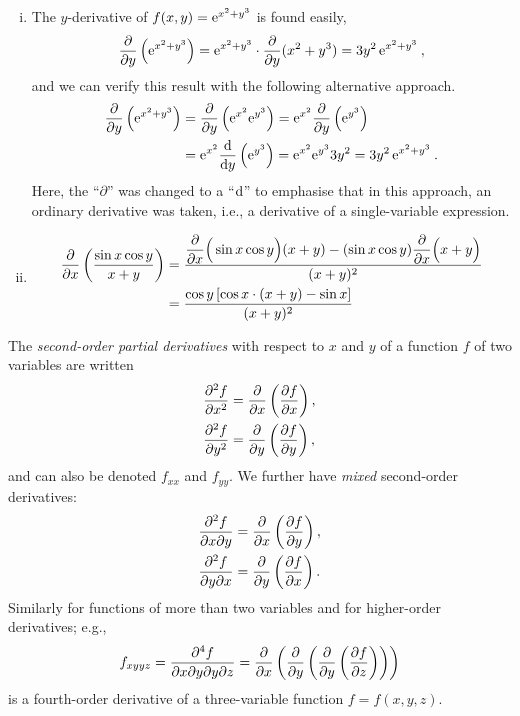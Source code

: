 \begin{example}
\begin{enumerate}[(i)]
	\item The $y$-derivative of $f(x,y)=\e^{x^2+y^3}$ is found easily,
	\[ \df{}{y} \left( \e^{x^2+y^3} \right) 
	= \e^{x^2+y^3} \cdot \df{}{y}(x^2+y^3) = 3y^2 \, \e^{x^2+y^3} \:, \]
	and we can verify this result with the following alternative approach.
	\begin{equation*}
	\begin{split}
	\df{}{y} \left( \e^{x^2+y^3} \right) & = \df{}{y} \left( \e^{x^2}\e^{y^3} \right) = \e^{x^2} \df{}{y} \left( \e^{y^3} \right) \\
	& = \e^{x^2} \Df{}{y} \left( \e^{y^3} \right) = \e^{x^2} \e^{y^3} 3y^2 
	= 3y^2 \, \e^{x^2+y^3} \:. 
	\end{split}
	\end{equation*}
	Here, the ``$\partial$'' was changed to a ``$\d$'' to emphasise that in this approach, an ordinary derivative was taken, i.e., a derivative of a single-variable expression.
	\item 
	\[\begin{split}
	 \df{}{x}\left( \frac{\sin x \cos y }{x+y}\right) 
	& = \frac{\df{}{x}\Big(\sin x \cos y\Big) (x+y) - (\sin x \cos y)\df{}{x}\Big(x+y\Big)}{(x+y)^2} \\
	& = \frac{\cos y \left[ \cos x \cdot (x+y) - \sin x \right]}{(x+y)^2} 
	\end{split} \]
	\smallskip
\end{enumerate}
\end{example}

\begin{definition}
The \emph{second-order partial derivatives} with respect to $x$ and $y$ of a function $f$ of two variables are written
\begin{equation*}
\begin{split}
\ddf{f}{x} & = \df{}{x}\left( \df{f}{x}\right) , \\
\ddf{f}{y} & = \df{}{y}\left( \df{f}{y}\right) ,
\end{split}
\end{equation*}
and can also be denoted $f_{xx}$ and $f_{yy}$. We further have \emph{mixed} second-order derivatives:
\begin{equation*}
\begin{split}
\dff{f}{x}{y} & = \df{}{x}\left( \df{f}{y}\right) , \\
\dff{f}{y}{x} & = \df{}{y}\left( \df{f}{x}\right) .
\end{split}
\end{equation*}
Similarly for functions of more than two variables and for higher-order derivatives; e.g.,
\[ f_{xyyz} =\frac{\partial^4 f}{\partial x \partial y \partial y \partial z} 
		   = \df{}{x}\left(\df{}{y}\left(\df{}{y}\left(\df{f}{z}\right)\right)\right) \]
is a fourth-order derivative of a three-variable function $f=f(x,y,z)$.
\end{definition}

